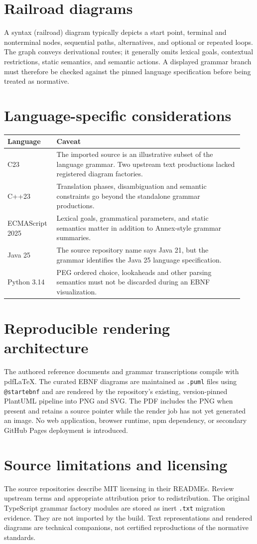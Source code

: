 \documentclass[11pt,letterpaper]{article}
\begin{document}
\section{Railroad diagrams}
A syntax (railroad) diagram typically depicts a start point, terminal
and nonterminal nodes, sequential paths, alternatives, and optional or
repeated loops. The graph conveys derivational routes; it generally omits
lexical goals, contextual restrictions, static semantics, and semantic
actions. A displayed grammar branch must therefore be checked against the
pinned language specification before being treated as normative.

\section{Language-specific considerations}
\begin{longtable}{p{0.19\linewidth}p{0.75\linewidth}}
\toprule
Language & Caveat\\
\midrule
C23 & The imported source is an illustrative subset of the language grammar.
Two upstream text productions lacked registered diagram factories.\\
C++23 & Translation phases, disambiguation and semantic constraints go beyond
the standalone grammar productions.\\
ECMAScript 2025 & Lexical goals, grammatical parameters, and static semantics
matter in addition to Annex-style grammar summaries.\\
Java 25 & The source repository name says Java 21, but the grammar identifies
the Java 25 language specification.\\
Python 3.14 & PEG ordered choice, lookaheads and other parsing semantics
must not be discarded during an EBNF visualization.\\
\bottomrule
\end{longtable}

\section{Reproducible rendering architecture}
The authored reference documents and grammar transcriptions compile
with pdfLaTeX. The curated EBNF diagrams are maintained as
\texttt{.puml} files using \texttt{@startebnf} and are rendered by the
repository's existing, version-pinned PlantUML pipeline into PNG and SVG.
The PDF includes the PNG when present and retains a source pointer while
the render job has not yet generated an image.
No web application, browser runtime, npm dependency, or secondary GitHub
Pages deployment is introduced.

\section{Source limitations and licensing}
The source repositories describe MIT licensing in their READMEs.
Review upstream terms and appropriate attribution prior to redistribution.
The original TypeScript grammar factory modules are stored as inert
\texttt{.txt} migration evidence. They are not imported by the build.
Text representations and rendered diagrams are technical companions,
not certified reproductions of the normative standards.
\end{document}
